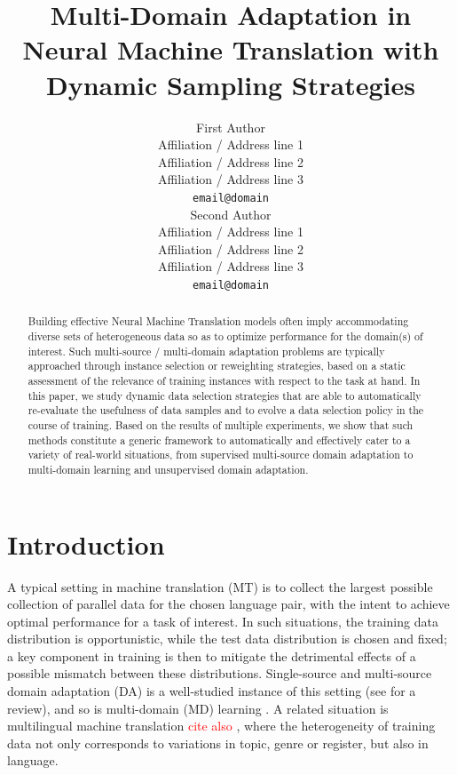 \documentclass[11pt]{article}
\title{Multi-Domain Adaptation in Neural Machine Translation with Dynamic Sampling Strategies}
\author{First Author \\
  Affiliation / Address line 1 \\
  Affiliation / Address line 2 \\
  Affiliation / Address line 3 \\
  \texttt{email@domain} \\\And
  Second Author \\
  Affiliation / Address line 1 \\
  Affiliation / Address line 2 \\
  Affiliation / Address line 3 \\
  \texttt{email@domain} \\}
\date{}
\newcommand{\fyTodo}[1]{\Todo[FY:]{\textcolor{orange}{#1}}}
\newcommand{\revision}[1]{\textcolor{red}{#1}}
\begin{document}
\maketitle
\setlength{\abovedisplayskip}{2pt}
\setlength{\belowdisplayskip}{2pt}
\begin{abstract}
  Building effective Neural Machine Translation models often imply accommodating diverse sets of heterogeneous data so as to optimize performance for the domain(s) of interest. Such multi-source / multi-domain adaptation problems are typically approached through instance selection or reweighting strategies, based on a static assessment of the relevance of training instances with respect to the task at hand. In this paper, we study dynamic data selection strategies that are able to automatically re-evaluate the usefulness of data samples and to evolve a data selection policy in the course of training. Based on the results of multiple experiments, we show that such methods constitute a generic framework to automatically and effectively cater to a variety of real-world situations, from supervised multi-source domain adaptation to multi-domain learning and unsupervised domain adaptation. 
\end{abstract}

\section{Introduction}\label{sec:intro}
A typical setting in machine translation (MT) is to collect the largest possible collection of parallel data for the chosen language pair, with the intent to achieve optimal performance for a task of interest. In such situations, the training data distribution is opportunistic, while the test data distribution is chosen and fixed; a key component in training is then to mitigate the detrimental effects of a possible mismatch between these distributions. Single-source and multi-source domain adaptation (DA) is a well-studied instance of this setting (see \citet{Chu2017comparison} for a review), and so is multi-domain (MD) learning \citep{Chu18multilingual,Zeng18multidomain,Jiang19multidomain,Pham21revisiting}. A related situation is multilingual machine translation \citep{Firat16multiway,Ha16towards,Johnson17google,Arivazhagan19massively}\fyTodo{Add more recent work} \revision{cite also \citep{shen21source}}, where the heterogeneity of training data not only corresponds to variations in topic, genre or register, but also in language.
\end{document}
